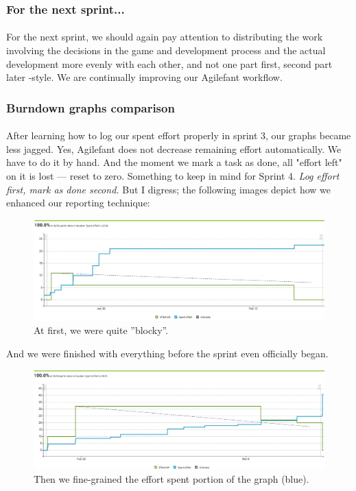 \subsubsection{For the next sprint...}

\paragraph{} For the next sprint, we should again pay attention to distributing the work involving the decisions in the game and development process and the actual development more evenly with each other, and not one part first, second part later -style. We are continually improving our Agilefant workflow.

\subsubsection{Burndown graphs comparison}

\paragraph{} After learning how to log our spent effort properly in sprint 3, our graphs became less jagged. Yes, Agilefant does not decrease remaining effort automatically. We have to do it by hand. And the moment we mark a task as done, all "effort left" on it is lost — reset to zero. Something to keep in mind for Sprint 4. \textit{Log effort first, mark as done second.} But I digress; the following images depict how we enhanced our reporting technique:

\begin{figure}[H]
\centering
\caption{At first, we were quite ''blocky''.} %
\includegraphics[width=\textwidth]{sprint1}
\end{figure}

And we were finished with everything before the sprint even officially began.

\begin{figure}[H]
\centering
\caption{Then we fine-grained the effort spent portion of the graph (blue).}
\includegraphics[width=\textwidth]{sprint2}
\end{figure}

